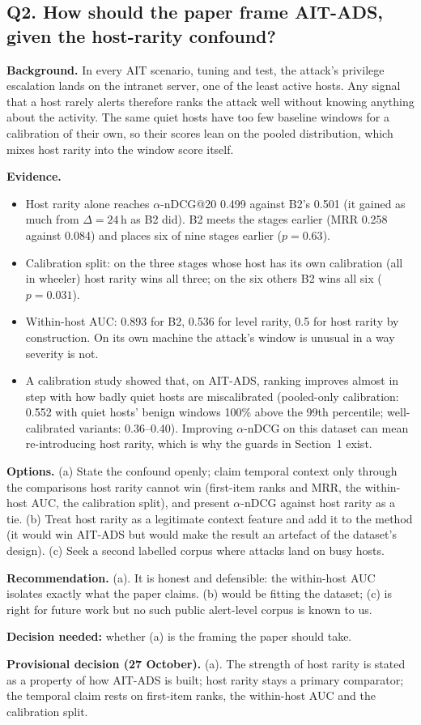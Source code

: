 \documentclass[10.5pt,a4paper]{article}
\newcommand{\rec}[1]{\par\smallskip\noindent\colorbox{gray!12}{\parbox{\dimexpr\linewidth-2\fboxsep}{\textbf{Recommendation.} #1}}\par\smallskip}
\newcommand{\ask}[1]{\par\noindent\textbf{Decision needed:} #1\par\medskip}
\newcommand{\dec}[1]{\par\smallskip\noindent\colorbox{blue!8}{\parbox{\dimexpr\linewidth-2\fboxsep}{\textbf{Provisional decision (27 October).} #1}}\par\medskip}
\newcommand{\sub}[1]{\par\smallskip\noindent\textbf{#1}\quad}
\begin{document}
\subsection*{Q2. How should the paper frame AIT-ADS, given the host-rarity confound?}

\sub{Background.} In every AIT scenario, tuning and test, the attack's privilege escalation lands on the intranet server, one of the least active hosts. Any signal that a host rarely alerts therefore ranks the attack well without knowing anything about the activity. The same quiet hosts have too few baseline windows for a calibration of their own, so their scores lean on the pooled distribution, which mixes host rarity into the window score itself.

\sub{Evidence.}
\begin{itemize}
\item Host rarity alone reaches $\alpha$-nDCG@20 0.499 against B2's 0.501 (it gained as much from $\Delta = 24$\,h as B2 did). B2 meets the stages earlier (MRR 0.258 against 0.084) and places six of nine stages earlier ($p = 0.63$).
\item Calibration split: on the three stages whose host has its own calibration (all in wheeler) host rarity wins all three; on the six others B2 wins all six ($p = 0.031$).
\item Within-host AUC: 0.893 for B2, 0.536 for level rarity, 0.5 for host rarity by construction. On its own machine the attack's window is unusual in a way severity is not.
\item A calibration study showed that, on AIT-ADS, ranking improves almost in step with how badly quiet hosts are miscalibrated (pooled-only calibration: 0.552 with quiet hosts' benign windows 100\% above the 99th percentile; well-calibrated variants: 0.36--0.40). Improving $\alpha$-nDCG on this dataset can mean re-introducing host rarity, which is why the guards in Section~1 exist.
\end{itemize}

\sub{Options.} (a) State the confound openly; claim temporal context only through the comparisons host rarity cannot win (first-item ranks and MRR, the within-host AUC, the calibration split), and present $\alpha$-nDCG against host rarity as a tie. (b) Treat host rarity as a legitimate context feature and add it to the method (it would win AIT-ADS but would make the result an artefact of the dataset's design). (c) Seek a second labelled corpus where attacks land on busy hosts.

\rec{(a). It is honest and defensible: the within-host AUC isolates exactly what the paper claims. (b) would be fitting the dataset; (c) is right for future work but no such public alert-level corpus is known to us.}
\ask{whether (a) is the framing the paper should take.}
\dec{(a). The strength of host rarity is stated as a property of how AIT-ADS is built; host rarity stays a primary comparator; the temporal claim rests on first-item ranks, the within-host AUC and the calibration split.}
\end{document}
